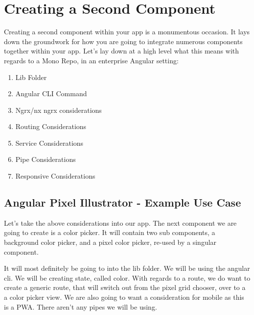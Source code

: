 
\section{ Creating a Second Component }
Creating a second component within your app is a monumentous occasion. It lays
down the groundwork for how you are going to integrate numerous components
together within your app. Let's lay down at a high level what this means with
regards to a Mono Repo, in an enterprise Angular setting:

\begin{enumerate}
  \item Lib Folder
  \item Angular CLI Command
  \item Ngrx/nx ngrx considerations
  \item Routing Considerations
  \item Service Considerations
  \item Pipe Considerations
  \item Responsive Considerations
\end{enumerate}

\subsection{ Angular Pixel Illustrator - Example Use Case }
Let's take the above considerations into our app. The next component we are
going to create is a color picker. It will contain two sub components, a
background color picker, and a pixel color picker, re-used by a singular
component.

It will most definitely be going to into the lib folder. We will be using the
angular cli. We will be creating state, called color. With regards to a route,
we do want to create a generic route, that will switch out from the pixel grid
chooser, over to a a color picker view. We are also going to want a
consideration for mobile as this is a PWA. There aren't any pipes we will be
using.

